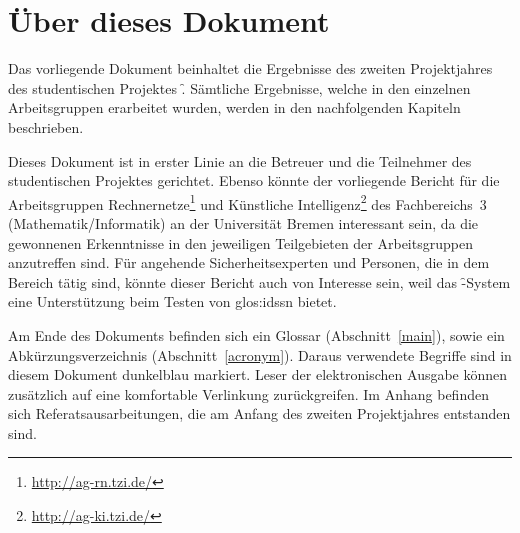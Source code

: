 
\section{Über dieses Dokument}
\label{sec:intro:about}

\authors{\JF \and \DH}{\LM \and \MW \and \BK}

Das vorliegende Dokument beinhaltet die Ergebnisse des zweiten
Projektjahres des studentischen Projektes \f. Sämtliche Ergebnisse,
welche in den einzelnen Arbeitsgruppen erarbeitet wurden, werden in
den nachfolgenden Kapiteln beschrieben.

Dieses Dokument ist in erster Linie an die Betreuer und die Teilnehmer
des studentischen Projektes gerichtet. Ebenso könnte der vorliegende
Bericht für die Arbeitsgruppen
Rechnernetze\footnote{\url{http://ag-rn.tzi.de/}} und Künstliche
Intelligenz\footnote{\url{http://ag-ki.tzi.de/}} des Fachbereichs~3
(Mathematik/Informatik) an der Universität Bremen interessant sein, da
die gewonnenen Erkenntnisse in den jeweiligen Teilgebieten der
Arbeitsgruppen anzutreffen sind. Für angehende
Sicherheitsexperten und Personen, die in dem Bereich tätig
sind, könnte dieser Bericht auch von Interesse sein, weil das
\f-System eine Unterstützung beim Testen von \glspl{glos:ids}n bietet.

Am Ende des Dokuments befinden sich ein Glossar
(Abschnitt~\ref{main}), sowie ein Abkürzungsverzeichnis
(Abschnitt~\ref{acronym}). Daraus verwendete Begriffe sind in diesem
Dokument \textcolor{Night Blue}{dunkelblau} markiert. Leser der
elektronischen Ausgabe können zusätzlich auf eine komfortable
Verlinkung zurückgreifen. Im Anhang befinden sich
Referatsausarbeitungen, die am Anfang des zweiten Projektjahres
entstanden sind.
